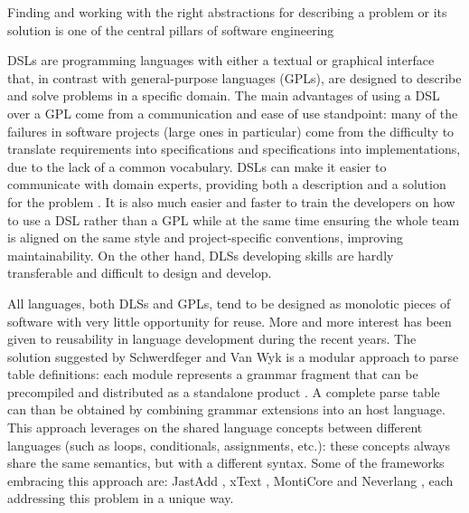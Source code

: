 Finding and working with the right abstractions for describing a problem or its solution is one of the central pillars of software engineering~\cite{Voelter12}



DSLs are programming languages with either a textual or graphical interface that, in contrast with general-purpose languages (GPLs), are designed to describe and solve problems in a specific domain. The main advantages of using a DSL over a GPL come from a communication and ease of use standpoint: many of the failures in software projects (large ones in particular) come from the difficulty to translate requirements into specifications and specifications into implementations, due to the lack of a common vocabulary. DSLs can make it easier to communicate with domain experts, providing both a description and a solution for the problem \cite{Fowler10}. It is also much easier and faster to train the developers on how to use a DSL rather than a GPL while at the same time ensuring the whole team is aligned on the same style and project-specific conventions, improving maintainability. On the other hand, DLSs developing skills are hardly transferable and difficult to design and develop.

All languages, both DLSs and GPLs, tend to be designed as monolotic pieces of software with very little opportunity for reuse. More and more interest has been given to reusability in language development during the recent years. The solution suggested by Schwerdfeger and Van Wyk is a modular approach to parse table definitions: each module represents a grammar fragment that can be precompiled and distributed as a standalone product \cite{Schwerdfeger09}. A complete parse table can than be obtained by combining grammar extensions into an host language. This approach leverages on the shared language concepts between different languages (such as loops, conditionals, assignments, etc.): these concepts always share the same semantics, but with a different syntax. Some of the frameworks embracing this approach are: JastAdd \cite{Hedin03}, xText \cite{Eclipse}, MontiCore \cite{Krahn10} and Neverlang \cite{Cazzola15c}, each addressing this problem in a unique way.

